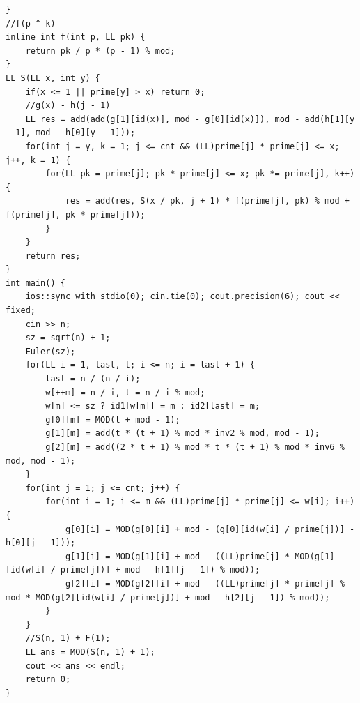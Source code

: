 \documentclass[10pt]{ctexart}
\begin{document}
{\begin{lstlisting}
}
//f(p ^ k)
inline int f(int p, LL pk) {
    return pk / p * (p - 1) % mod;
}
LL S(LL x, int y) {
    if(x <= 1 || prime[y] > x) return 0;
    //g(x) - h(j - 1)
    LL res = add(add(g[1][id(x)], mod - g[0][id(x)]), mod - add(h[1][y - 1], mod - h[0][y - 1]));
    for(int j = y, k = 1; j <= cnt && (LL)prime[j] * prime[j] <= x; j++, k = 1) {
        for(LL pk = prime[j]; pk * prime[j] <= x; pk *= prime[j], k++) {
            res = add(res, S(x / pk, j + 1) * f(prime[j], pk) % mod + f(prime[j], pk * prime[j]));
        }
    }
    return res;
}
int main() {
    ios::sync_with_stdio(0); cin.tie(0); cout.precision(6); cout << fixed;
    cin >> n; 
    sz = sqrt(n) + 1;
    Euler(sz);
    for(LL i = 1, last, t; i <= n; i = last + 1) {
        last = n / (n / i);
        w[++m] = n / i, t = n / i % mod;
        w[m] <= sz ? id1[w[m]] = m : id2[last] = m;
        g[0][m] = MOD(t + mod - 1);
        g[1][m] = add(t * (t + 1) % mod * inv2 % mod, mod - 1);
        g[2][m] = add((2 * t + 1) % mod * t * (t + 1) % mod * inv6 % mod, mod - 1);
    }
    for(int j = 1; j <= cnt; j++) {
        for(int i = 1; i <= m && (LL)prime[j] * prime[j] <= w[i]; i++) {
            g[0][i] = MOD(g[0][i] + mod - (g[0][id(w[i] / prime[j])] - h[0][j - 1]));
            g[1][i] = MOD(g[1][i] + mod - ((LL)prime[j] * MOD(g[1][id(w[i] / prime[j])] + mod - h[1][j - 1]) % mod));
            g[2][i] = MOD(g[2][i] + mod - ((LL)prime[j] * prime[j] % mod * MOD(g[2][id(w[i] / prime[j])] + mod - h[2][j - 1]) % mod));
        }
    }
    //S(n, 1) + F(1);
    LL ans = MOD(S(n, 1) + 1);
    cout << ans << endl;
    return 0;
}
\end{lstlisting}

}
\end{document}

